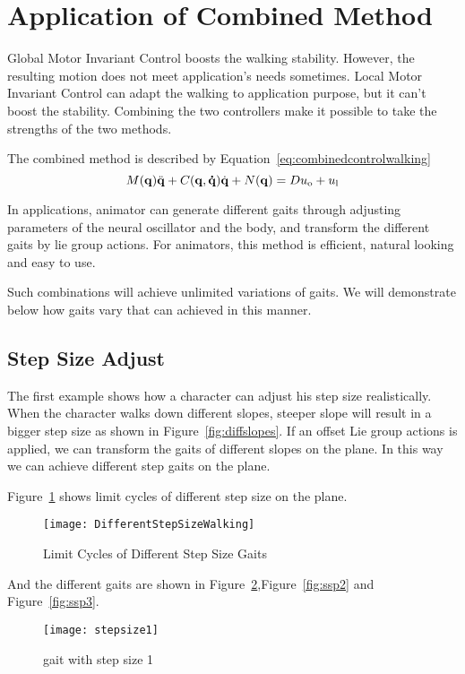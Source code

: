 \section{Application of Combined Method}
Global Motor Invariant Control boosts the walking stability.
However,  the resulting motion does not meet application's needs sometimes.
Local Motor Invariant Control can adapt the walking to application purpose, but it can't boost the stability.
Combining the two controllers make it possible to take the strengths of the two methods.

The combined method is described by Equation~\ref{eq:combinedcontrolwalking}
\begin{equation}
\label{eq:combinedcontrolwalking}
M(\mathbf{q}) \ddot{\mathbf{q}} + C(\mathbf{q,\dot{q}})\dot{\mathbf{q}} + N(\mathbf{q}) = Du_{\mathrm{o}}+u_{\mathrm{l}}
\end{equation}

In applications, animator can generate different gaits through  adjusting  parameters of the neural oscillator and the body, and transform the different gaits by lie group actions.
For animators, this method is efficient, natural looking and easy to use.

Such combinations will achieve unlimited variations of gaits.
We will demonstrate below how gaits vary that can achieved in this manner.

\subsection{Step Size Adjust}
The first example shows how a character can adjust his step size realistically.
When the character walks down different slopes, steeper slope will result in a bigger step size as shown in Figure~\ref{fig:diffslopes}. 
If an offset Lie group actions is applied, we can transform the gaits of different slopes on the plane.
In this way we can achieve different step gaits on the plane.

Figure~\ref{fig:differentstepsizeonplaine} shows limit cycles of different step size on the plane.
\begin{figure}[!htbp]
  \begin{center}
      \texttt{[image: DifferentStepSizeWalking]}
    \caption{Limit Cycles of Different Step Size Gaits}
    \label{fig:differentstepsizeonplaine}
\end{center}
\end{figure}


And the different gaits are shown in Figure~\ref{fig:ssp1},Figure~\ref{fig:ssp2} and Figure~\ref{fig:ssp3}.
\begin{figure}[!htbp]
  \begin{center}
      \texttt{[image: stepsize1]}
    \caption{gait with step size 1}
    \label{fig:ssp1}
\end{center}
\end{figure}

